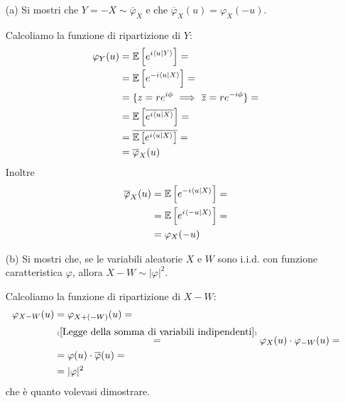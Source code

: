 \Soluzione{} %
\begin{enumerate}
\item [(a)] Si mostri che $Y=-X\sim\overline{\varphi}_X$ e che $\overline{\varphi}_X(u)=\varphi_X(-u)$.

Calcoliamo la funzione di ripartizione di $Y$:
\begin{gather*}
\begin{aligned}
\varphi_Y(u)&=\mathbb{E}\left[e^{i\langle u|Y \rangle}  \right]=\\
&=\mathbb{E}\left[e^{-i\langle u|X \rangle}  \right]=\\
&=\{z=re^{i\phi}\ \Longrightarrow\  \overline{z}=re^{-i\phi}  \}=\\
&=\mathbb{E}\left[\overline{e^{i\langle u|X \rangle}  }\right]=\\
&=\overline{\mathbb{E}\left[e^{i\langle u|X \rangle}  \right]}=\\
&=\overline{\varphi}_X(u)
\end{aligned}
\end{gather*}
Inoltre
\begin{gather*}
\begin{aligned}
\overline{\varphi}_X(u)&=\mathbb{E}\left[e^{-i\langle u|X \rangle}  \right]=\\
&=\mathbb{E}\left[e^{i\langle -u|X \rangle}  \right]=\\
&=\varphi_X(-u)
\end{aligned}
\end{gather*}

\item [(b)] Si mostri che, se le variabili aleatorie $X$ e $W$ sono i.i.d. con funzione caratteristica $\varphi$, allora $X-W\sim|\varphi|^2$.

Calcoliamo la funzione di ripartizione di $X-W$:
\begin{gather*}
\begin{aligned}
\varphi_{X-W}(u)&=\varphi_{X+(-W)}(u)=\\
&\overset{\underset{(\ref{Legge della somma di variabili indipendenti})}{}}{=}\varphi_X(u)\cdot \varphi_{-W}(u)=\\
&=\varphi(u)\cdot\overline{\varphi}(u)=\\
&=|\varphi|^2
\end{aligned}
\end{gather*}
che è quanto volevasi dimostrare.

\end{enumerate}

